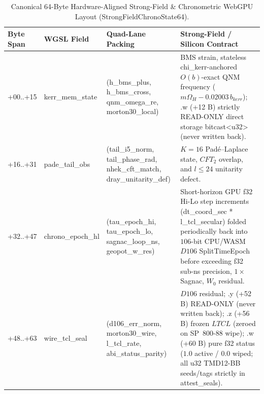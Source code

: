 \documentclass[11pt,a4paper,reqno]{article}
\def\texttt#1{#1}%
\def\mathrm#1{#1}%
\def\mathcal#1{#1}%
\def\mathbb#1{#1}%
\def\Done{D106}%
\def\LTCL{LTCL}%
\theoremstyle{plain}
\theoremstyle{definition}
\theoremstyle{remark}
\numberwithin{equation}{section}
\numberwithin{table}{section}
\newcommand{\Done}{\mathbb{D}_{106}}
\newcommand{\LTCL}{L_{\mathrm{TCL}}}
\begin{document}
\begin{table}[H]
\centering
\scriptsize
\caption[Canonical 64-Byte Strong-Field WebGPU ABI]{Canonical 64-Byte Hardware-Aligned Strong-Field \& Chronometric WebGPU Layout (\texttt{StrongFieldChronoState64}).}
\label{tab:abi_layout_vol7}
\setlength{\tabcolsep}{4pt}
\begin{tabularx}{\textwidth}{@{} C{1.60cm} P{2.80cm} P{4.05cm} Y @{}}
\toprule
\textbf{Byte Span} & \textbf{WGSL Field} & \textbf{Quad-Lane Packing} & \textbf{Strong-Field / Silicon Contract} \\
\midrule
\texttt{+00..+15} & \texttt{kerr\_mem\_state} & \texttt{(h\_bms\_plus, h\_bms\_cross, qnm\_omega\_re, morton30\_local)} & BMS strain, stateless \texttt{chi\_kerr}-anchored $\mathcal{O}(b)$-exact QNM frequency ($m\Omega_H - 0.02003\,b_{\mathrm{kerr}}$); \texttt{.w} (\texttt{+12 B}) strictly READ-ONLY direct storage \texttt{bitcast<u32>} (never written back). \\
\texttt{+16..+31} & \texttt{pade\_tail\_obs} & \texttt{(tail\_i5\_norm, tail\_phase\_rad, nhek\_cft\_match, dray\_unitarity\_def)} & $K=16$ Pad\'e--Laplace state, $\mathrm{CFT}_2$ overlap, and $l\le 24$ unitarity defect. \\
\texttt{+32..+47} & \texttt{chrono\_epoch\_hl} & \texttt{(tau\_epoch\_hi, tau\_epoch\_lo, sagnac\_loop\_ns, geopot\_w\_res)} & Short-horizon GPU \texttt{f32} Hi-Lo step increments (\texttt{dt\_coord\_sec * l\_tcl\_secular}) folded periodically back into $106$-bit CPU/WASM $\Done$ \texttt{SplitTimeEpoch} before exceeding \texttt{f32} sub-ns precision, $1\times$ Sagnac, $W_0$ residual. \\
\texttt{+48..+63} & \texttt{wire\_tcl\_seal} & \texttt{(d106\_err\_norm, morton30\_wire, l\_tcl\_rate, abi\_status\_parity)} & $\Done$ residual; \texttt{.y} (\texttt{+52 B}) READ-ONLY (never written back); \texttt{.z} (\texttt{+56 B}) frozen $\LTCL$ (zeroed on SP~800-88 wipe); \texttt{.w} (\texttt{+60 B}) pure \texttt{f32} status ($1.0$ active / $0.0$ wiped; all \texttt{u32} \texttt{TMD12-BB} seeds/tags strictly in \texttt{attest\_seals}). \\
\bottomrule
\end{tabularx}
\end{table}
\end{document}

